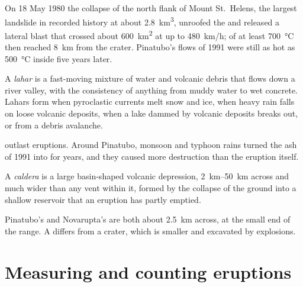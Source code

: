 On 18 May 1980 the collapse of the north flank of Mount St.~Helens, the largest
landslide in recorded history at about \qty{2.8}{km^3}, unroofed the  and
released a lateral blast that crossed about \qty{600}{km^2} at up to
\qty{480}{km/h};  of at least \qty{700}{\celsius} then reached
\qty{8}{km} from the crater. Pinatubo's flows of 1991 were still as hot as
\qty{500}{\celsius} inside five years later.

\begin{definition}[Lahar]\label{def:b2:eruptive-styles:lahar}
A \emph{lahar} is a fast-moving mixture of water and volcanic debris
that flows down a river valley, with the consistency of anything from muddy water
to wet concrete. Lahars form when pyroclastic currents melt snow and ice, when
heavy rain falls on loose volcanic deposits, when a lake dammed by volcanic
deposits breaks out, or from a debris avalanche.
\end{definition}

 outlast eruptions. Around Pinatubo, monsoon and typhoon rains turned the
ash of 1991 into  for years, and they caused more destruction than the
eruption itself.

\begin{definition}[Caldera]\label{def:b2:eruptive-styles:caldera}
A \emph{caldera} is a large basin-shaped volcanic depression,
\qtyrange{2}{50}{km} across and much wider than any vent within it, formed by
the collapse of the ground into a shallow  reservoir that an eruption has
partly emptied.
\end{definition}

Pinatubo's and Novarupta's  are both about \qty{2.5}{km} across, at the
small end of the range. A  differs from a crater, which is smaller and excavated by explosions.

\section{Measuring and counting eruptions}

